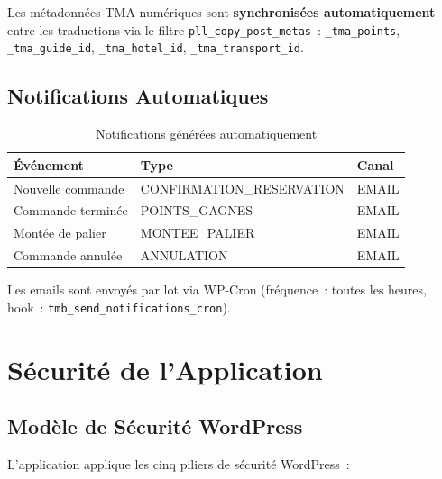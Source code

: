 \documentclass[12pt,a4paper]{report}
\begin{document}
Les m\'etadonn\'ees TMA num\'eriques sont \textbf{synchronis\'ees automatiquement}
entre les traductions via le filtre \texttt{pll\_copy\_post\_metas}~:
\texttt{\_tma\_points}, \texttt{\_tma\_guide\_id}, \texttt{\_tma\_hotel\_id},
\texttt{\_tma\_transport\_id}.

\section{Notifications Automatiques}

\begin{table}[H]
\centering
\caption{Notifications g\'en\'er\'ees automatiquement}
\begin{tabularx}{\linewidth}{llX}
  \toprule
  \textbf{\'Ev\'enement} & \textbf{Type} & \textbf{Canal} \\
  \midrule
  Nouvelle commande   & CONFIRMATION\_RESERVATION & EMAIL \\
  Commande termin\'ee & POINTS\_GAGNES             & EMAIL \\
  Mont\'ee de palier  & MONTEE\_PALIER             & EMAIL \\
  Commande annul\'ee  & ANNULATION                & EMAIL \\
  \bottomrule
\end{tabularx}
\end{table}

Les emails sont envoy\'es par lot via WP-Cron (fr\'equence~: toutes les heures,
hook~: \texttt{tmb\_send\_notifications\_cron}).

\chapter{S\'ecurit\'e de l'Application}

\section{Mod\`ele de S\'ecurit\'e WordPress}

L'application applique les cinq piliers de s\'ecurit\'e WordPress~:
\end{document}
